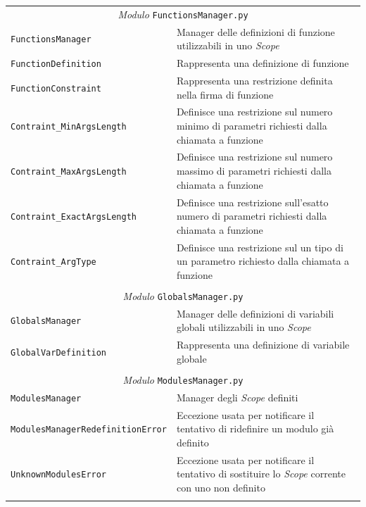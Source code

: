 \begin{longtable}{p{5.5cm}p{6.5cm}}
\multicolumn{2}{c}{\emph{Modulo} \texttt{FunctionsManager.py}}\\
	\hdashline[5pt/5pt]
		\texttt{FunctionsManager} & Manager delle definizioni di funzione utilizzabili in uno \emph{Scope}\\ 
	\hdashline[1pt/5pt]
		\texttt{FunctionDefinition} & Rappresenta una definizione di funzione\\ 
	\hdashline[1pt/5pt]
		\texttt{FunctionConstraint} & Rappresenta una restrizione definita nella firma di funzione\\ 
	\hdashline[1pt/5pt]
		\texttt{Contraint\_MinArgsLength} & Definisce una restrizione sul numero minimo di parametri richiesti dalla chiamata a funzione\\ 
	\hdashline[1pt/5pt]
		\texttt{Contraint\_MaxArgsLength} & Definisce una restrizione sul numero massimo di parametri richiesti dalla chiamata a funzione\\ 
	\hdashline[1pt/5pt]
		\texttt{Contraint\_ExactArgsLength} & Definisce una restrizione sull'esatto numero di parametri richiesti dalla chiamata a funzione\\ 
	\hdashline[1pt/5pt]
		\texttt{Contraint\_ArgType} & Definisce una restrizione sul un tipo di un parametro richiesto dalla chiamata a funzione\\ 
	\hline\\

\multicolumn{2}{c}{\emph{Modulo} \texttt{GlobalsManager.py}}\\
	\hdashline[5pt/5pt]
		\texttt{GlobalsManager} & Manager delle definizioni di variabili globali utilizzabili in uno \emph{Scope}\\ 
	\hdashline[1pt/5pt]
		\texttt{GlobalVarDefinition} & Rappresenta una definizione di variabile globale\\ 
	\hline\\

\multicolumn{2}{c}{\emph{Modulo} \texttt{ModulesManager.py}}\\
	\hdashline[5pt/5pt]
		\texttt{ModulesManager} & Manager degli \emph{Scope} definiti\\ 
	\hdashline[1pt/5pt]
		\texttt{Modules\-Manager\-Re\-de\-fi\-ni\-tion\-Er\-ror} & Eccezione usata per notificare il tentativo di ridefinire un modulo già definito\\ 
	\hdashline[1pt/5pt]
		\texttt{UnknownModulesError} & Eccezione usata per notificare il tentativo di sostituire lo \emph{Scope} corrente con uno non definito\\ 
	\hline\\


\end{longtable}
